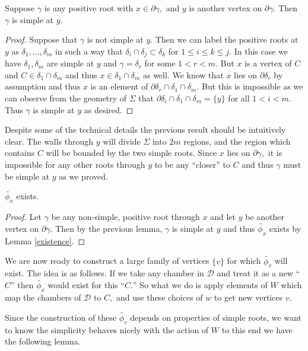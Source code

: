 \documentclass[class=book, crop=false,12 pt]{standalone}
\begin{document}
\begin{lemma}
	Suppose $\gamma$ is any positive root with $x\in \partial \gamma,$ and $y$ is another vertex on $\partial \gamma.$ Then $\gamma$ is simple at $y.$ \label{positiveeverywhereelse}
\end{lemma}
\begin{proof} 
	Suppose that $\gamma$ is not simple at $y.$ Then we can label the positive roots at $y$ as $\delta_1,\dots,\delta_m$ in such a way that $\delta_i\cap \delta_j\subset \delta_k$ for $1\le i\le k\le j.$ In this case we have $\delta_1,\delta_m$ are simple at $y$ and $\gamma=\delta_r$ for some $1<r<m.$ But $x$ is a vertex of $C$ and $C\in \delta_1\cap \delta_m$ and thus $x\in \delta_1\cap \delta_m$ as well. We know that $x$ lies on $\partial \delta_r$ by assumption and thus $x$ is an element of $\partial \delta_r \cap \delta_1\cap \delta_m.$ But this is impossible as we can observe from the geometry of $\Sigma$ that $\partial \delta_i\cap \delta_1\cap \delta_m=\{y\}$ for all $1<i<m.$ Thus $\gamma$ is simple at $y$ as desired.
\end{proof}
Despite some of the technical details the previous result should be intuitively clear. The walls through $y$ will divide $\Sigma$ into $2m$ regions, and the region which contains $C$ will be bounded by the two simple roots. Since $x$ lies on $\partial \gamma,$ it is impossible for any other roots through $y$ to be any ``closer'' to $C$ and thus $\gamma$ must be simple at $y$ as we proved.
\begin{cor}
	$\tilde{\phi_x}$ exists.
\end{cor}
\begin{proof}
	Let $\gamma$ be any non-simple, positive root through $x$ and let $y$ be another vertex on $\partial \gamma.$ Then by the previous lemma, $\gamma$ is simple at $y$ and thus $\tilde{\phi_x}$ exists by Lemma \ref{existence}.
\end{proof}

We are now ready to construct a large family of vertices $\{v\}$ for which $\tilde{\phi_v}$ will exist. The idea is as follows. If we take any chamber in $\mathcal{D}$ and treat it as a new ``$C$'' then $\tilde{\phi_x}$ would exist for this ``$C.$'' So what we do is apply elements of $W$ which map the chambers of $\mathcal{D}$ to $C,$ and use these choices of $w$ to get new vertices $v.$

Since the construction of these $\tilde{\phi_v}$ depends on properties of simple roots, we want to know the simplicity behaves nicely with the action of $W$ to this end we have the following lemma.
\end{document}
